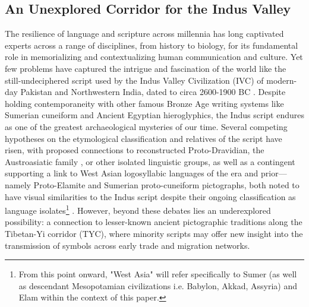 \documentclass[11pt,a4paper,oneside]{report}
\begin{document}
\subsection{An Unexplored Corridor for the Indus Valley}
\noindent\hspace{1cm}
The resilience of language and scripture across millennia has long captivated experts across a range of disciplines, from history to biology, for its fundamental role in memorializing and contextualizing human communication and culture. Yet few problems have captured the intrigue and fascination of the world like the still-undeciphered script used by the Indus Valley Civilization (IVC) of modern-day Pakistan and Northwestern India, dated to circa 2600-1900 BC \cite{parpola_special_2005}. Despite holding contemporaneity with other famous Bronze Age writing systems like Sumerian cuneiform and Ancient Egyptian hieroglyphics, the Indus script endures as one of the greatest archaeological mysteries of our time. Several competing hypotheses on the etymological classification and relatives of the script have risen, with proposed connections to reconstructed Proto-Dravidian, the Austroasiatic family \cite{witzel_linguistic_2009}, or other isolated linguistic groups, as well as a contingent supporting a link to West Asian logosyllabic languages of the era and prior—namely Proto-Elamite and Sumerian proto-cuneiform pictographs, both noted to have visual similarities to the Indus script despite their ongoing classification as language isolates\footnote{From this point onward, "West Asia" will refer specifically to Sumer (as well as descendant Mesopotamian civilizations i.e. Babylon, Akkad, Assyria) and Elam within the context of this paper.} \cite{mcalpin_toward_1974}. However, beyond these debates lies an underexplored possibility: a connection to lesser-known ancient pictographic traditions along the Tibetan-Yi corridor (TYC), where minority scripts may offer new insight into the transmission of symbols across early trade and migration networks.
\end{document}

